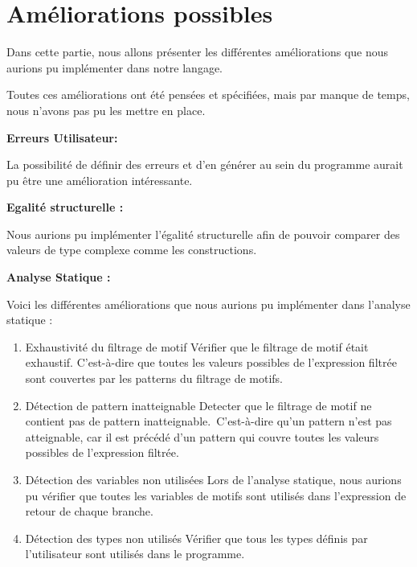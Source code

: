 \documentclass[
  12pt,
]{article}
\begin{document}
\section{Améliorations possibles}\label{amuxe9liorations-possibles}

Dans cette partie, nous allons présenter les différentes améliorations
que nous aurions pu implémenter dans notre langage.

Toutes ces améliorations ont été pensées et spécifiées, mais par manque
de temps, nous n'avons pas pu les mettre en place.

\textbf{Erreurs Utilisateur:}

La possibilité de définir des erreurs et d'en générer au sein du
programme aurait pu être une amélioration intéressante.

\textbf{Egalité structurelle :}

Nous aurions pu implémenter l'égalité structurelle afin de pouvoir
comparer des valeurs de type complexe comme les constructions.

\textbf{Analyse Statique :}

Voici les différentes améliorations que nous aurions pu implémenter dans
l'analyse statique :

\begin{enumerate}
      \item
            Exhaustivité du filtrage de motif
            Vérifier que le filtrage de motif était exhaustif. C'est-à-dire que toutes les valeurs possibles de l’expression filtrée sont couvertes par les patterns du filtrage de motifs.
      \item
            Détection de pattern inatteignable
            Detecter que le filtrage de motif ne contient pas de pattern inatteignable.\
            C'est-à-dire qu'un pattern n'est pas atteignable, car il est précédé d'un pattern qui couvre toutes les valeurs possibles de l'expression filtrée.
      \item
            Détection des variables non utilisées
            Lors de l'analyse statique, nous aurions pu vérifier que toutes les variables de motifs sont utilisés dans l'expression de retour de chaque branche.
      \item
            Détection des types non utilisés
            Vérifier que tous les types définis par l'utilisateur sont utilisés dans le programme.
\end{enumerate}
\end{document}
